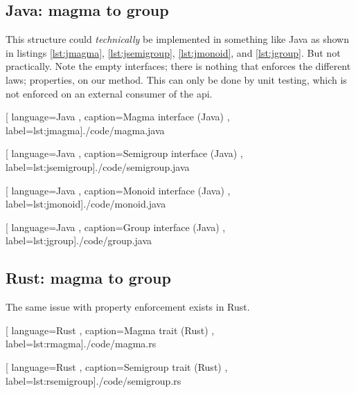 \subsection{Java: magma to group}

This structure could \textit{technically} be implemented in something like Java
as shown in listings \ref{lst:jmagma}, \ref{lst:jsemigroup}, \ref{lst:jmonoid},
and \ref{lst:jgroup}. But not practically. Note the empty interfaces; there is
nothing that enforces the different laws; properties, on our method. This can
only be done by unit testing, which is not enforced on an external consumer of
the \gls*{api}.

\begin{center}
  
    [ language=Java
    , caption={Magma interface (Java)}
    , label=lst:jmagma]{./code/magma.java}
\end{center}

\begin{center}
  
    [ language=Java
    , caption={Semigroup interface (Java)}
    , label=lst:jsemigroup]{./code/semigroup.java}
\end{center}

\begin{center}
  
    [ language=Java
    , caption={Monoid interface (Java)}
    , label=lst:jmonoid]{./code/monoid.java}
\end{center}

\begin{center}
  
    [ language=Java
    , caption={Group interface (Java)}
    , label=lst:jgroup]{./code/group.java}
\end{center}

\subsection{Rust: magma to group}

The same issue with property enforcement exists in Rust.

\begin{center}
  
    [ language=Rust
    , caption={Magma trait (Rust)}
    , label=lst:rmagma]{./code/magma.rs}
\end{center}

\begin{center}
  
    [ language=Rust
    , caption={Semigroup trait (Rust)}
    , label=lst:rsemigroup]{./code/semigroup.rs}
\end{center}

